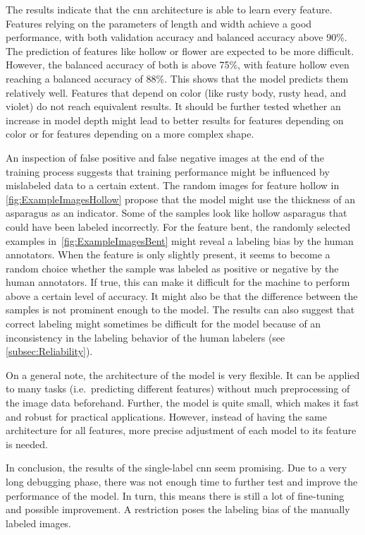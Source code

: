 \bigskip
The results indicate that the \acrshort{cnn} architecture is able to learn every feature. Features relying on the parameters of length and width achieve a good performance, with both validation accuracy and balanced accuracy above 90\%. The prediction of features like hollow or flower are expected to be more difficult. However, the balanced accuracy of both is above 75\%, with feature hollow even reaching a balanced accuracy of 88\%. This shows that the model predicts them relatively well. Features that depend on color (like rusty body, rusty head, and violet) do not reach equivalent results. It should be further tested whether an increase in model depth might lead to better results for features depending on color or for features depending on a more complex shape.
 
An inspection of false positive and false negative images at the end of the training process suggests that training performance might be influenced by mislabeled data to a certain extent.
The random images for feature hollow in \autoref{fig:ExampleImagesHollow} propose that the model might use the thickness of an asparagus as an indicator. Some of the samples look like hollow asparagus that could have been labeled incorrectly.
For the feature bent, the randomly selected examples in~\autoref{fig:ExampleImagesBent} might reveal a labeling bias by the human annotators. When the feature is only slightly present, it seems to become a random choice whether the sample was labeled as positive or negative by the human annotators. If true, this can make it difficult for the machine to perform above a certain level of accuracy. It might also be that the difference between the samples is not prominent enough to the model.
The results can also suggest that correct labeling might sometimes be difficult for the model because of an inconsistency in the labeling behavior of the human labelers (see \autoref{subsec:Reliability}).
 
On a general note, the architecture of the model is very flexible. It can be applied to many tasks (i.e.\ predicting different features) without much preprocessing of the image data beforehand. Further, the model is quite small, which makes it fast and robust for practical applications. However, instead of having the same architecture for all features, more precise adjustment of each model to its feature is needed.
 
\bigskip
In conclusion, the results of the single-label  \acrshort{cnn} seem promising. Due to a very long debugging phase, there was not enough time to further test and improve the performance of the model. In turn, this means there is still a lot of fine-tuning and possible improvement. A restriction poses the labeling bias of the manually labeled images.

